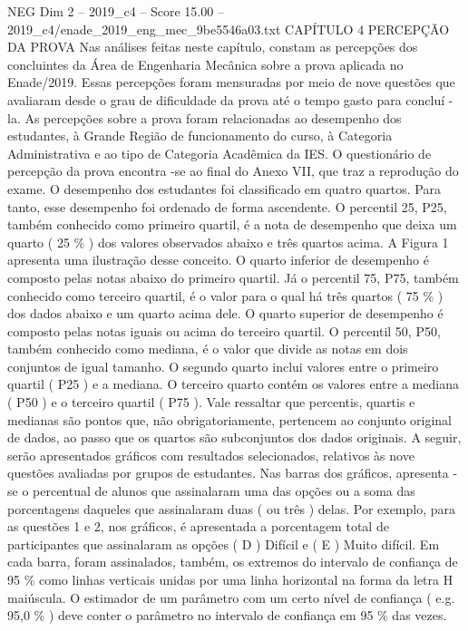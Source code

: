 \begin{textsample}{NEG Dim 2 – 2019\_c4 – Score 15.00 – 2019\_c4/enade\_2019\_eng\_mec\_9be5546a03.txt}  \label{ex:f2_neg_389}
CAPÍTULO 4 PERCEPÇÃO DA PROVA Nas análises feitas neste capítulo, constam as percepções dos concluintes da Área de Engenharia Mecânica sobre a prova aplicada no Enade/2019.
Essas percepções foram mensuradas por meio de nove questões que avaliaram desde o grau de dificuldade da prova até o tempo gasto para concluí -la.
As percepções sobre a prova foram relacionadas ao desempenho dos estudantes, à Grande Região de funcionamento do curso, à Categoria Administrativa e ao tipo de Categoria Acadêmica da IES.
O questionário de percepção da prova encontra -se ao final do Anexo VII, que traz a reprodução do exame.
O desempenho dos estudantes foi classificado em quatro quartos.
Para tanto, esse desempenho foi ordenado de forma ascendente.
O percentil 25, P25, também conhecido como primeiro quartil, é a nota de desempenho que deixa um quarto ( 25 \% ) dos valores observados abaixo e três quartos acima.
A Figura 1 apresenta uma ilustração desse conceito.
O quarto inferior de desempenho é composto pelas notas abaixo do primeiro quartil.
Já o percentil 75, P75, também conhecido como terceiro quartil, é o valor para o qual há três quartos ( 75 \% ) dos dados abaixo e um quarto acima dele.
O quarto superior de desempenho é composto pelas notas iguais ou acima do terceiro quartil.
O percentil 50, P50, também conhecido como mediana, é o valor que divide as notas em dois conjuntos de igual tamanho.
O segundo quarto inclui valores entre o primeiro quartil ( P25 ) e a mediana.
O terceiro quarto contém os valores entre a mediana ( P50 ) e o terceiro quartil ( P75 ).
Vale ressaltar que percentis, quartis e medianas são pontos que, não obrigatoriamente, pertencem ao conjunto original de dados, ao passo que os quartos são subconjuntos dos dados originais.
A seguir, serão apresentados gráficos com resultados selecionados, relativos às nove questões avaliadas por grupos de estudantes.
Nas barras dos gráficos, apresenta -se o percentual de alunos que assinalaram uma das opções ou a soma das porcentagens daqueles que assinalaram duas ( ou três ) delas.
Por exemplo, para as questões 1 e 2, nos gráficos, é apresentada a porcentagem total de participantes que assinalaram as opções ( D ) Difícil e ( E ) Muito difícil.
Em cada barra, foram assinalados, também, os extremos do intervalo de confiança de 95 \% como linhas verticais unidas por uma linha horizontal na forma da letra H maiúscula.
O estimador de um parâmetro com um certo nível de confiança ( e.g. 95,0 \% ) deve conter o parâmetro no intervalo de confiança em 95 \% das vezes.

\end{textsample}
